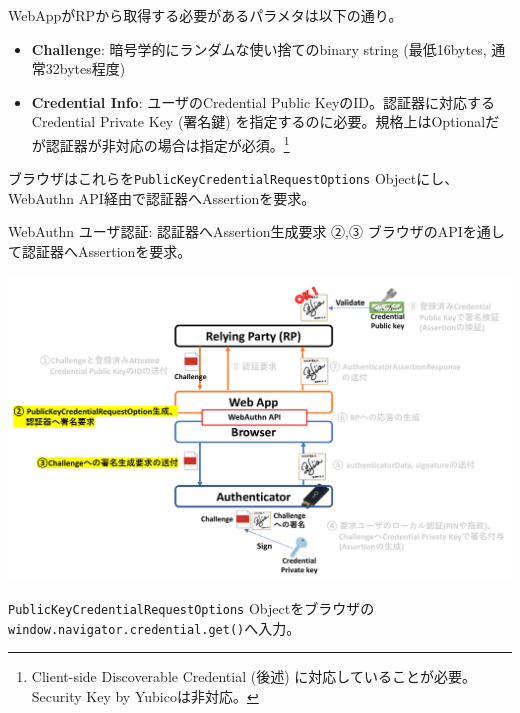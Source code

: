\documentclass[12pt,dvipdfmx,uplatex]{beamer}
\begin{document}
\begin{frame}
WebAppがRPから取得する必要があるパラメタは以下の通り。
\begin{itemize}
 \item \textbf{Challenge}: \alert{暗号学的にランダムな使い捨てのbinary string (最低16bytes, 通常32bytes程度)}
 \item \textbf{Credential Info}: ユーザのCredential Public KeyのID。認証器に対応するCredential Private Key (署名鍵) を指定するのに必要。規格上はOptionalだが\alert{認証器が非対応の場合は指定が必須。}\footnote[frame]{\scriptsize Client-side Discoverable Credential (後述) に対応していることが必要。Security Key by Yubicoは非対応。}
\end{itemize}

\vspace{2ex}

ブラウザはこれらを\texttt{PublicKeyCredentialRequestOptions} Objectにし、WebAuthn API経由で認証器へAssertionを要求。
\end{frame}


\begin{frame}{WebAuthn ユーザ認証: 認証器へAssertion生成要求}
②,③ ブラウザのAPIを通して認証器へAssertionを要求。
\begin{center}
\includegraphics[width=0.9\linewidth]{Figs/webauthn-authentication2.pdf}
\end{center}
\texttt{PublicKeyCredentialRequestOptions} Objectをブラウザの\texttt{window.navigator.credential.get()}へ入力。
\end{frame}
\end{document}
